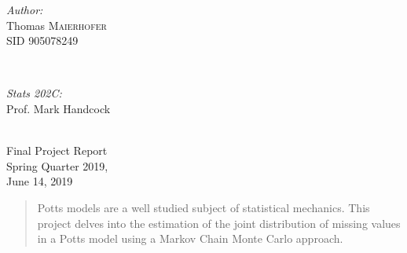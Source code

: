\documentclass[12pt, twoside]{article}
\newcommand{\1}{\mathbb{1}}
\begin{document}
\begin{titlepage}
    \hspace{1cm}
    \begin{minipage}{0.4\textwidth}
    \begin{flushleft} \large
    \emph{Author:}\\
        Thomas \textsc{Maierhofer}\\
        SID 905078249 %
    \end{flushleft}
    \end{minipage}
    ~
    \begin{minipage}{0.4\textwidth}
    \begin{flushright} \large
    \emph{Stats 202C:} \\
    Prof. Mark Handcock \\ %
    \text{}
    \end{flushright}
    \end{minipage}\\[2cm]
    
    \large{
    Final Project Report
    } \\[2cm]
    
    {\large Spring Quarter 2019,} \\
    {\large June 14, 2019}\\[2cm] %


    \vfill %

\end{titlepage}


\tableofcontents 
\clearpage

\begin{abstract}
Potts models are a well studied subject of statistical mechanics. This project delves into the estimation of the joint distribution of missing values in a Potts model using a Markov Chain Monte Carlo approach.
\end{abstract}
\clearpage
{}
\end{document}
